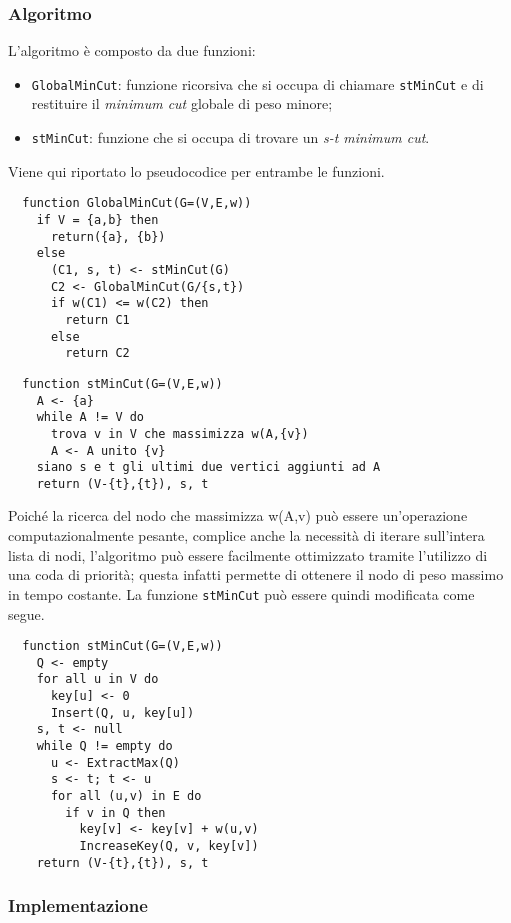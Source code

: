 \subsubsection{Algoritmo}

L'algoritmo è composto da due funzioni:
\begin{itemize}
  \item \texttt{GlobalMinCut}: funzione ricorsiva che si occupa di chiamare \texttt{stMinCut} e di restituire il \textit{minimum cut} globale di peso minore;
  \item \texttt{stMinCut}: funzione che si occupa di trovare un \textit{s-t minimum cut}.
\end{itemize}

Viene qui riportato lo pseudocodice per entrambe le funzioni.

\begin{verbatim}
  function GlobalMinCut(G=(V,E,w))
    if V = {a,b} then
      return({a}, {b})
    else
      (C1, s, t) <- stMinCut(G)
      C2 <- GlobalMinCut(G/{s,t})
      if w(C1) <= w(C2) then
        return C1
      else
        return C2
\end{verbatim}

\begin{verbatim}
  function stMinCut(G=(V,E,w))
    A <- {a}
    while A != V do
      trova v in V che massimizza w(A,{v})
      A <- A unito {v}
    siano s e t gli ultimi due vertici aggiunti ad A
    return (V-{t},{t}), s, t
\end{verbatim}

Poiché la ricerca del nodo che massimizza w(A,{v}) può essere un'operazione computazionalmente pesante, complice anche la necessità di iterare sull'intera lista di nodi, l'algoritmo può essere facilmente ottimizzato tramite l'utilizzo di una coda di priorità; questa infatti permette di ottenere il nodo di peso massimo in tempo costante. La funzione \texttt{stMinCut} può essere quindi modificata come segue.

\begin{verbatim}
  function stMinCut(G=(V,E,w))
    Q <- empty
    for all u in V do
      key[u] <- 0
      Insert(Q, u, key[u])
    s, t <- null
    while Q != empty do
      u <- ExtractMax(Q)
      s <- t; t <- u
      for all (u,v) in E do
        if v in Q then
          key[v] <- key[v] + w(u,v)
          IncreaseKey(Q, v, key[v])
    return (V-{t},{t}), s, t
\end{verbatim}

\subsubsection{Implementazione}

